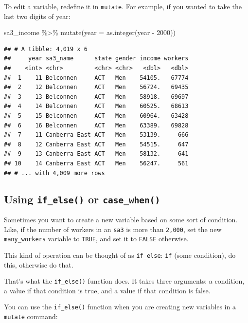 \documentclass[
]{book}
\newenvironment{Shaded}{\begin{snugshade}}{\end{snugshade}}
\newcommand{\AttributeTok}[1]{\textcolor[rgb]{0.77,0.63,0.00}{#1}}
\newcommand{\DecValTok}[1]{\textcolor[rgb]{0.00,0.00,0.81}{#1}}
\newcommand{\FunctionTok}[1]{\textcolor[rgb]{0.00,0.00,0.00}{#1}}
\newcommand{\NormalTok}[1]{#1}
\newcommand{\SpecialCharTok}[1]{\textcolor[rgb]{0.00,0.00,0.00}{#1}}
\begin{document}
To edit a variable, redefine it in \texttt{mutate}. For example, if you wanted to take the last two digits of year:

\begin{Shaded}
\begin{Highlighting}[]
\NormalTok{sa3\_income }\SpecialCharTok{\%\textgreater{}\%} 
  \FunctionTok{mutate}\NormalTok{(}\AttributeTok{year =} \FunctionTok{as.integer}\NormalTok{(year }\SpecialCharTok{{-}} \DecValTok{2000}\NormalTok{))}
\end{Highlighting}
\end{Shaded}

\begin{verbatim}
## # A tibble: 4,019 x 6
##     year sa3_name      state gender income workers
##    <int> <chr>         <chr> <chr>   <dbl>   <dbl>
##  1    11 Belconnen     ACT   Men    54105.   67774
##  2    12 Belconnen     ACT   Men    56724.   69435
##  3    13 Belconnen     ACT   Men    58918.   69697
##  4    14 Belconnen     ACT   Men    60525.   68613
##  5    15 Belconnen     ACT   Men    60964.   63428
##  6    16 Belconnen     ACT   Men    63389.   69828
##  7    11 Canberra East ACT   Men    53139.     666
##  8    12 Canberra East ACT   Men    54515.     647
##  9    13 Canberra East ACT   Men    58132.     641
## 10    14 Canberra East ACT   Men    56247.     561
## # ... with 4,009 more rows
\end{verbatim}

\hypertarget{using-if_else-or-case_when}{%
\subsection{\texorpdfstring{Using \texttt{if\_else()} or \texttt{case\_when()}}{Using if\_else() or case\_when()}}\label{using-if_else-or-case_when}}

Sometimes you want to create a new variable based on some sort of condition. Like, if the number of workers in an \texttt{sa3} is more than \texttt{2,000}, set the new \texttt{many\_workers} variable to \texttt{TRUE}, and set it to \texttt{FALSE} otherwise.

This kind of operation can be thought of as \texttt{if\_else}: \texttt{if} (some condition), do this, otherwise do that.

That's what the \texttt{if\_else()} function does. It takes three arguments: a condition, a value if that condition is true, and a value if that condition is false.

You can use the \texttt{if\_else()} function when you are creating new variables in a \texttt{mutate} command:
\end{document}
